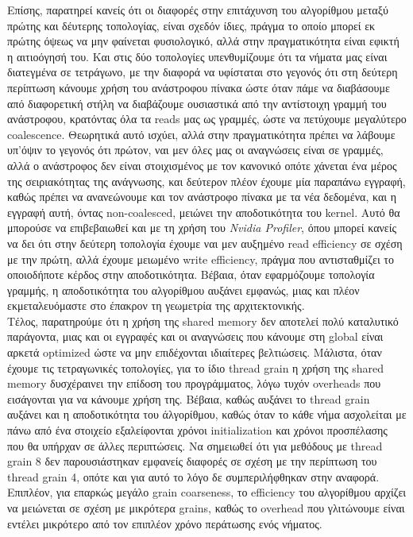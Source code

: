 \documentclass[11pt,a4paper,titlepage]{article}
\begin{document}
	Επίσης, παρατηρεί κανείς ότι οι διαφορές στην επιτάχυνση του αλγορίθμου μεταξύ πρώτης και δέυτερης τοπολογίας, είναι σχεδόν ίδιες, πράγμα το οποίο μπορεί εκ πρώτης όψεως να μην φαίνεται φυσιολογικό, αλλά στην πραγματικότητα είναι εφικτή η αιτιοόγησή του. Και στις δύο τοπολογίες υπενθυμίζουμε ότι τα νήματα μας είναι διατεγμένα σε τετράγωνο, με την διαφορά να υφίσταται στο γεγονός ότι στη δεύτερη περίπτωση κάνουμε χρήση του ανάστροφου πίνακα ώστε όταν πάμε να διαβάσουμε από διαφορετική στήλη να διαβάζουμε ουσιαστικά από την αντίστοιχη γραμμή του ανάστροφου, κρατόντας όλα τα reads μας ως γραμμές, ώστε να πετύχουμε μεγαλύτερο coalescence. Θεωρητικά αυτό ισχύει, αλλά στην πραγματικότητα πρέπει να λάβουμε υπ'όψιν το γεγονός ότι πρώτον, ναι μεν όλες μας οι αναγνώσεις είναι σε γραμμές, αλλά ο ανάστροφος δεν είναι στοιχισμένος με τον κανονικό οπότε χάνεται ένα μέρος της σειριακότητας της ανάγνωσης, και δεύτερον πλέον έχουμε μία παραπάνω εγγραφή, καθώς πρέπει να ανανεώνουμε και τον ανάστροφο πίνακα με τα νέα δεδομένα, και η εγγραφή αυτή, όντας non-coalesced, μειώνει την αποδοτικότητα του kernel. Αυτό θα μπορούσε να επιβεβαιωθεί και με τη χρήση του \textit{Nvidia Profiler}, όπου μπορεί κανείς να δει ότι στην δεύτερη τοπολογία έχουμε ναι μεν αυξημένο read efficiency σε σχέση με την πρώτη, αλλά έχουμε μειωμένο write efficiency, πράγμα που αντισταθμίζει το οποιοδήποτε κέρδος στην αποδοτικότητα. Βέβαια, όταν εφαρμόζουμε τοπολογία γραμμής, η αποδοτικότητα του αλγορίθμου αυξάνει εμφανώς, μιας και πλέον εκμεταλευόμαστε στο έπακρον τη γεωμετρία της αρχιτεκτονικής.\\

	Τέλος, παρατηρούμε ότι η χρήση της shared memory δεν αποτελεί πολύ καταλυτικό παράγοντα, μιας και οι εγγραφές και οι αναγνώσεις που κάνουμε στη global είναι αρκετά optimized ώστε να μην επιδέχονται ιδιαίτερες βελτιώσεις. Μάλιστα, όταν έχουμε τις τετραγωνικές τοπολογίες, για το ίδιο thread grain η χρήση της shared memory δυσχέραινει την επίδοση του προγράμματος, λόγω τυχόν overheads που εισάγονται για να κάνουμε χρήση της. Βέβαια, καθώς αυξάνει το thread grain αυξάνει και η αποδοτικότητα του άλγορίθμου, καθώς όταν το κάθε νήμα ασχολείται με πάνω από ένα στοιχείο εξαλείφονται χρόνοι initialization και χρόνοι προσπέλασης που θα υπήρχαν σε άλλες περιπτώσεις. Να σημειωθεί ότι για μεθόδους με thread grain 8 δεν παρουσιάστηκαν εμφανείς διαφορές σε σχέση με την περίπτωση του thread grain 4, οπότε και για αυτό το λόγο δε συμπεριλήφθηκαν στην αναφορά. Επιπλέον, για επαρκώς μεγάλο grain coarseness, το efficiency του αλγορίθμου αρχίζει να μειώνεται σε σχέση με μικρότερα grains, καθώς το overhead που γλιτώνουμε είναι εντέλει μικρότερο από τον επιπλέον χρόνο περάτωσης ενός νήματος.\\
\clearpage
\end{document}
